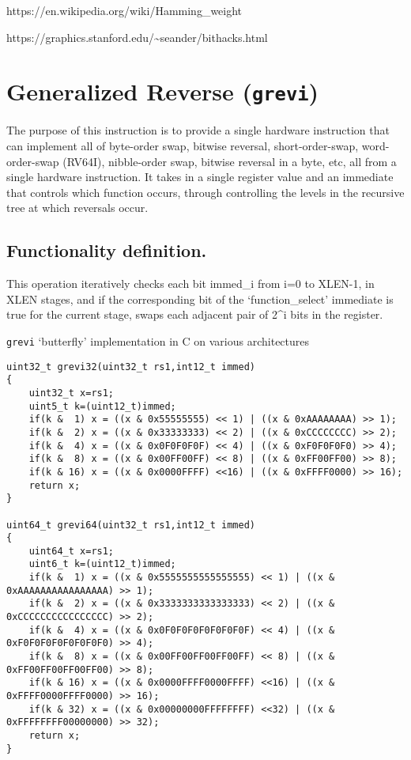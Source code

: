 https://en.wikipedia.org/wiki/Hamming\_weight

https://graphics.stanford.edu/\textasciitilde{}seander/bithacks.html

\section{\texorpdfstring{Generalized Reverse
(\texttt{grevi})}{Generalized Reverse (grevi)}}\label{generalized-reverse-grevi}

The purpose of this instruction is to provide a single hardware
instruction that can implement all of byte-order swap, bitwise reversal,
short-order-swap, word-order-swap (RV64I), nibble-order swap, bitwise
reversal in a byte, etc, all from a single hardware instruction. It
takes in a single register value and an immediate that controls which
function occurs, through controlling the levels in the recursive tree at
which reversals occur.

\subsection{Functionality
definition.}\label{functionality-definition.-1}

This operation iteratively checks each bit immed\_i from i=0 to XLEN-1,
in XLEN stages, and if the corresponding bit of the `function\_select'
immediate is true for the current stage, swaps each adjacent pair of
2\^{}i bits in the register.

\texttt{grevi} `butterfly' implementation in C on various architectures

\begin{verbatim}
uint32_t grevi32(uint32_t rs1,int12_t immed)
{
    uint32_t x=rs1;
    uint5_t k=(uint12_t)immed;
    if(k &  1) x = ((x & 0x55555555) << 1) | ((x & 0xAAAAAAAA) >> 1);
    if(k &  2) x = ((x & 0x33333333) << 2) | ((x & 0xCCCCCCCC) >> 2);
    if(k &  4) x = ((x & 0x0F0F0F0F) << 4) | ((x & 0xF0F0F0F0) >> 4);
    if(k &  8) x = ((x & 0x00FF00FF) << 8) | ((x & 0xFF00FF00) >> 8);
    if(k & 16) x = ((x & 0x0000FFFF) <<16) | ((x & 0xFFFF0000) >> 16);
    return x;
}

uint64_t grevi64(uint32_t rs1,int12_t immed)
{
    uint64_t x=rs1;
    uint6_t k=(uint12_t)immed;
    if(k &  1) x = ((x & 0x5555555555555555) << 1) | ((x & 0xAAAAAAAAAAAAAAAA) >> 1);
    if(k &  2) x = ((x & 0x3333333333333333) << 2) | ((x & 0xCCCCCCCCCCCCCCCC) >> 2);
    if(k &  4) x = ((x & 0x0F0F0F0F0F0F0F0F) << 4) | ((x & 0xF0F0F0F0F0F0F0F0) >> 4);
    if(k &  8) x = ((x & 0x00FF00FF00FF00FF) << 8) | ((x & 0xFF00FF00FF00FF00) >> 8);
    if(k & 16) x = ((x & 0x0000FFFF0000FFFF) <<16) | ((x & 0xFFFF0000FFFF0000) >> 16);
    if(k & 32) x = ((x & 0x00000000FFFFFFFF) <<32) | ((x & 0xFFFFFFFF00000000) >> 32);
    return x;
}
\end{verbatim}

